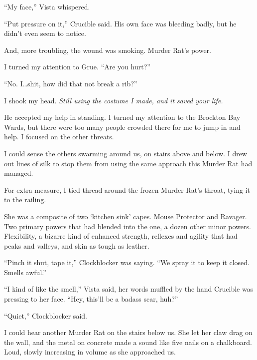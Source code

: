 ``My face,'' Vista whispered.



``Put pressure on it,'' Crucible said.  His own face was bleeding badly, but he didn't even seem to notice.



And, more troubling, the wound was smoking.  Murder Rat's power.



I turned my attention to Grue.  ``Are you hurt?''



``No.  I\ldots shit, how did that not break a rib?''



I shook my head.  \emph{Still using the costume I made, and it saved your life.}



He accepted my help in standing.  I turned my attention to the Brockton Bay Wards, but there were too many people crowded there for me to jump in and help.  I focused on the other threats.



I could sense the others swarming around us, on stairs above and below.  I drew out lines of silk to stop them from using the same approach this Murder Rat had managed.



For extra measure, I tied thread around the frozen Murder Rat's throat, tying it to the railing.



She was a composite of two `kitchen sink' capes.  Mouse Protector and Ravager.  Two primary powers that had blended into the one, a dozen other minor powers.  Flexibility, a bizarre kind of enhanced strength, reflexes and agility that had peaks and valleys, and skin as tough as leather.



``Pinch it shut, tape it,'' Clockblocker was saying.  ``We spray it to keep it closed.  Smells awful.''



``I kind of like the smell,'' Vista said, her words muffled by the hand Crucible was pressing to her face.  ``Hey, this'll be a badass scar, huh?''



``Quiet,'' Clockblocker said.



I could hear another Murder Rat on the stairs below us.  She let her claw drag on the wall, and the metal on concrete made a sound like five nails on a chalkboard.   Loud, slowly increasing in volume as she approached us.



